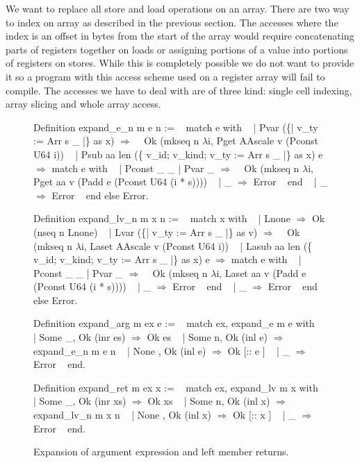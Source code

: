 \documentclass{article}
\begin{document}
\medskip

We want to replace all store and load operations on an array. There are two way
to index on array as described in the previous section. The accesses where the
index is an offset in bytes from the start of the array would require
concatenating parts of registers together on loads or assigning portions of a
value into portions of registers on stores. While this is completely possible we
do not want to provide it so a program with this access scheme used on a
register array will fail to compile.
The accesses we have to deal with are of three kind: single cell indexing,
array slicing and whole array access.

\smallskip

\begin{figure}[p]
\obeylines\obeyspaces\ttfamily%
Definition expand\_e\_n m e n :=
~ match e with
~ | Pvar (\{| v\_ty := Arr s \_ |\} as x) \(\Rightarrow\)
~   Ok (mkseq n \(\lambda\)i, Pget AAscale v (Pconst U64 i))
~ | Psub aa len (\{ v\_id; v\_kind; v\_ty := Arr s \_ |\} as x) e \(\Rightarrow\) match e with
~   | Pconst \_ \_ | Pvar \_ \(\Rightarrow\)
~     Ok (mkseq n \(\lambda\)i, Pget aa v (Padd e (Pconst U64 (i * s))))
~   | \_ \(\Rightarrow\) Error
~   end
~ | \_ \(\Rightarrow\) Error
~ end else Error.
 
Definition expand\_lv\_n m x n :=
~ match x with
~ | Lnone \(\Rightarrow\) Ok (nseq n Lnone)
~ | Lvar (\{| v\_ty := Arr s \_ |\} as v) \(\Rightarrow\)
~   Ok (mkseq n \(\lambda\)i, Laset AAscale v (Pconst U64 i))
~ | Lasub aa len (\{ v\_id; v\_kind; v\_ty := Arr s \_ |\} as x) e \(\Rightarrow\) match e with
~   | Pconst \_ \_ | Pvar \_ \(\Rightarrow\)
~     Ok (mkseq n \(\lambda\)i, Laset aa v (Padd e (Pconst U64 (i * s))))
~   | \_ \(\Rightarrow\) Error
~   end
~ | \_ \(\Rightarrow\) Error
~ end else Error.

Definition expand\_arg m ex e :=
~ match ex, expand\_e m e with
~ | Some \_, Ok (inr es)  \(\Rightarrow\) Ok es
~ | Some n, Ok (inl e)   \(\Rightarrow\) expand\_e\_n m e n
~ | None  , Ok (inl e)   \(\Rightarrow\) Ok [:: e ]
~ | \_                    \(\Rightarrow\) Error
~ end.

Definition expand\_ret m ex x :=
~ match ex, expand\_lv m x with
~ | Some \_, Ok (inr xs)   \(\Rightarrow\) Ok xs
~ | Some n, Ok (inl x)    \(\Rightarrow\) expand\_lv\_n m x n
~ | None  , Ok (inl x)    \(\Rightarrow\) Ok [:: x ]
~ | \_                     \(\Rightarrow\) Error
~ end.
\normalfont%
\caption{Expansion of argument expression and left member returns.}
\end{figure}
\end{document}
